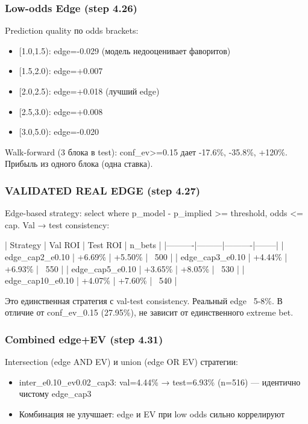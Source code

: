 \documentclass[12pt,a4paper]{article}
\begin{document}
\subsubsection{Low-odds Edge (step 4.26)}
Prediction quality по odds brackets:
\begin{itemize}
  \item [1.0,1.5): edge=-0.029 (модель недооценивает фаворитов)
  \item [1.5,2.0): edge=+0.007
  \item [2.0,2.5): edge=+0.018 (лучший edge)
  \item [2.5,3.0): edge=+0.008
  \item [3.0,5.0): edge=-0.020
\end{itemize}

Walk-forward (3 блока в test): conf\_ev>=0.15 дает -17.6\%, -35.8\%, +120\%. Прибыль из одного блока (одна ставка).

\subsubsection{VALIDATED REAL EDGE (step 4.27)}
Edge-based strategy: select where p\_model - p\_implied >= threshold, odds <= cap.
Val → test consistency:

| Strategy | Val ROI | Test ROI | n\_bets |
|----------|---------|----------|--------|
| edge\_cap2\_e0.10 | +6.69\% | +5.50\% | ~500 |
| edge\_cap3\_e0.10 | +4.44\% | +6.93\% | ~550 |
| edge\_cap5\_e0.10 | +3.65\% | +8.05\% | ~530 |
| edge\_cap10\_e0.10 | +4.07\% | +7.60\% | ~540 |

Это единственная стратегия с val-test consistency. Реальный edge ~5-8\%.
В отличие от conf\_ev\_0.15 (27.95\%), не зависит от единственного extreme bet.

\subsubsection{Combined edge+EV (step 4.31)}
Intersection (edge AND EV) и union (edge OR EV) стратегии:
\begin{itemize}
  \item inter\_e0.10\_ev0.02\_cap3: val=4.44\% → test=6.93\% (n=516) — идентично чистому edge\_cap3
  \item Комбинация не улучшает: edge и EV при low odds сильно коррелируют
\end{itemize}
\end{document}
